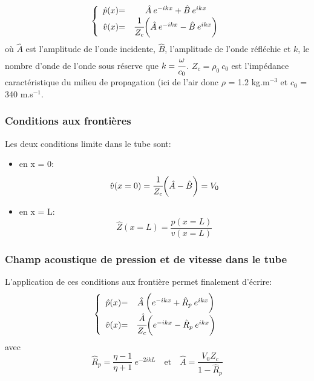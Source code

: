 \documentclass[a4paper,11pt]{article}
\begin{document}
\[ \left \{
\begin{array}{c @{= \quad} c}
	 \hat{p}(x)			& \hat{A} \: e^{-ikx} + \hat{B} \: e^{ikx}\\
	 \hat{v}(x)			& \cfrac{1}{Z_c} \bigg( \hat{A} \: e^{-ikx} - \hat{B} \: e^{ikx} \bigg)
\end{array}
\right. \]
où $\hat{A}$ est l'amplitude de l'onde incidente, $\hat{B}$, l'amplitude de l'onde réfléchie et $k$, le nombre d'onde de l'onde sous réserve que $k = \cfrac{\omega}{c_0}$. $Z_c = \rho_0 \: c_0$ est l'impédance caractéristique du milieu de propagation (ici de l'air donc $\rho$ = 1.2 kg.m$^{-3}$ et $c_0$ = 340 m.s$^{-1}$.  

\subsubsection{Conditions aux frontières}
Les deux conditions limite dans le tube sont:
\begin{itemize}
	\item en x = 0:
\begin{equation*}
	\hat{v} (x=0) = \cfrac{1}{Z_c} \bigg( \hat{A} - \hat{B} \bigg) = V_0
\end{equation*}

	\item en x = L: 
\begin{equation*}
	\hat{Z}(x=L) = \frac{\hat{p} (x=L)}{\hat{v} (x=L)}
\end{equation*}
\end{itemize}

\subsubsection{Champ acoustique de pression et de vitesse dans le tube}
L'application de ces conditions aux frontière permet finalement d'écrire:
\[ \left \{
\begin{array}{c @{= \quad} c}
	 \hat{p}(x)			& \hat{A} \: \bigg( e^{-ikx} + \hat{R}_p \: e^{ikx} \bigg)\\
	 \hat{v}(x)			& \cfrac{\hat{A}}{Z_c} \bigg( e^{-ikx} - \hat{R}_p \: e^{ikx} \bigg)
\end{array}
\right. \]
avec 
\begin{equation*}
	\hat{R}_p = \frac{\eta - 1}{\eta + 1} \: e^{-2ikL} \quad \text{et} \quad \hat{A} = \frac{V_0 Z_c}{1 - \hat{R}_p}
\end{equation*}
\end{document}
